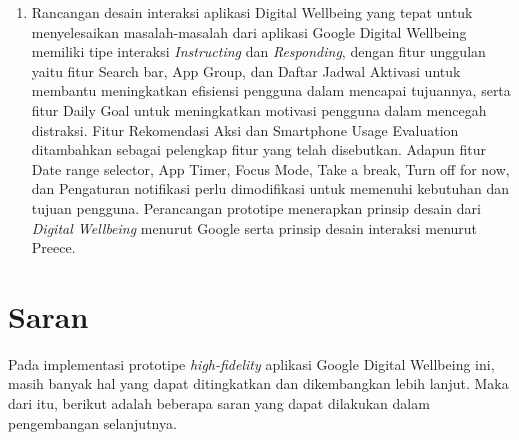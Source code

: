 \begin{enumerate}
  \item Rancangan desain interaksi aplikasi Digital Wellbeing yang tepat untuk menyelesaikan masalah-masalah dari aplikasi Google Digital Wellbeing memiliki tipe interaksi \textit{Instructing} dan \textit{Responding}, dengan fitur unggulan yaitu fitur Search bar, App Group, dan Daftar Jadwal Aktivasi untuk membantu meningkatkan efisiensi pengguna dalam mencapai tujuannya, serta fitur Daily Goal untuk meningkatkan motivasi pengguna dalam mencegah distraksi. Fitur Rekomendasi Aksi dan Smartphone Usage Evaluation ditambahkan sebagai pelengkap fitur yang telah disebutkan. Adapun fitur Date range selector, App Timer, Focus Mode, Take a break, Turn off for now, dan Pengaturan notifikasi perlu dimodifikasi untuk memenuhi kebutuhan dan tujuan pengguna. Perancangan prototipe menerapkan prinsip desain dari \textit{Digital Wellbeing} menurut Google serta prinsip desain interaksi menurut Preece.  
   
\end{enumerate}

\section{Saran}
Pada implementasi prototipe \textit{high-fidelity} aplikasi Google Digital Wellbeing ini, masih banyak hal yang dapat ditingkatkan dan dikembangkan lebih lanjut. Maka dari itu, berikut adalah beberapa saran yang dapat dilakukan dalam pengembangan selanjutnya.

